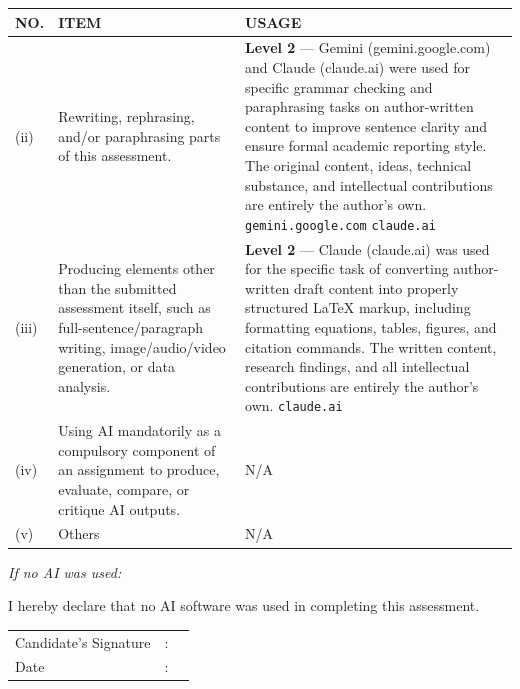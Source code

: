 \noindent\begin{tabular}{|p{}|p{}|p{}|}
\hline
\textbf{NO.} & \textbf{ITEM} & \textbf{USAGE} \\
\hline
(ii) &
Rewriting, rephrasing, and/or paraphrasing parts of this assessment. &
\textbf{Level 2} --- Gemini (gemini.google.com) and Claude (claude.ai) were used for specific grammar checking and paraphrasing tasks on author-written content to improve sentence clarity and ensure formal academic reporting style. The original content, ideas, technical substance, and intellectual contributions are entirely the author's own.\newline
\texttt{gemini.google.com}\newline
\texttt{claude.ai} \\
\hline
(iii) &
Producing elements other than the submitted assessment itself, such as full-sentence/paragraph writing, image/audio/video generation, or data analysis. &
\textbf{Level 2} --- Claude (claude.ai) was used for the specific task of converting author-written draft content into properly structured \LaTeX{} markup, including formatting equations, tables, figures, and citation commands. The written content, research findings, and all intellectual contributions are entirely the author's own.\newline
\texttt{claude.ai} \\
\hline
(iv) &
Using AI mandatorily as a compulsory component of an assignment to produce, evaluate, compare, or critique AI outputs. &
N/A \\
\hline
(v) &
Others &
N/A \\
\hline
\end{tabular}

\vspace{2em}

{\setlength{\parindent}{0pt}
\noindent \textit{If no AI was used:}

\vspace{0.8em}

\noindent{}\quad I hereby declare that no AI software was used in completing this assessment.}

\vspace{3em}

\noindent
\begin{tabular}{p{} p{} p{}}
Candidate's Signature & : & \underline{\hspace{7cm}} \\[1.2em]
Date                  & : & \underline{\hspace{7cm}} \\
\end{tabular}